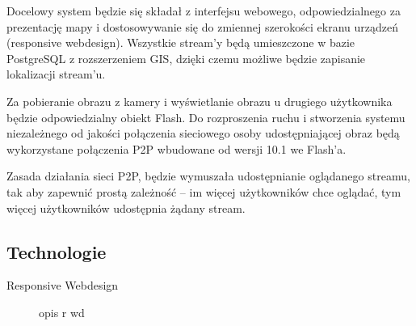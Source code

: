 Docelowy system będzie się składał z interfejsu webowego, odpowiedzialnego za prezentację mapy i dostosowywanie się do zmiennej szerokości ekranu urządzeń (responsive webdesign). Wszystkie stream'y będą umieszczone w bazie PostgreSQL z rozszerzeniem GIS, dzięki czemu możliwe będzie zapisanie lokalizacji stream'u.

Za pobieranie obrazu z kamery i wyświetlanie obrazu u drugiego użytkownika będzie odpowiedzialny obiekt Flash. Do rozproszenia ruchu i stworzenia systemu niezależnego od jakości połączenia sieciowego osoby udostępniającej obraz będą wykorzystane połączenia P2P wbudowane od wersji 10.1 we Flash'a.

Zasada działania sieci P2P, będzie wymuszała udostępnianie oglądanego streamu, tak aby zapewnić prostą zależność -- im więcej użytkowników chce oglądać, tym więcej użytkowników udostępnia żądany stream.

\subsection{Technologie}
\label{sec:EtapIawTechnologie}

\begin{description}
    \item[Responsive Webdesign] opis r wd
\end{description}

\newpage
